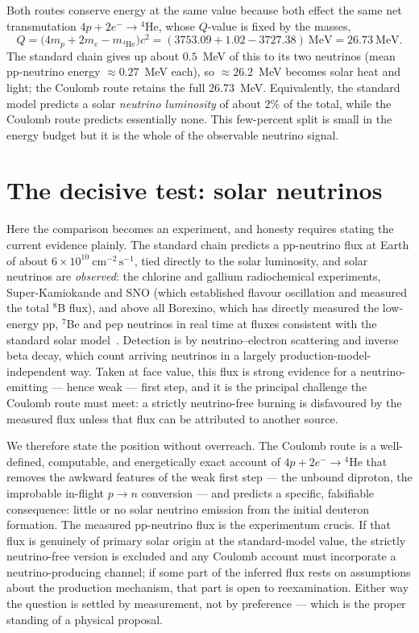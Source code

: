 \documentclass[11pt]{article}
\begin{document}
Both routes conserve energy at the same value because both effect the same net transmutation
$4p+2e^-\to{}^4\mathrm{He}$, whose $Q$-value is fixed by the masses,
\begin{equation}
Q = \big(4m_p + 2m_e - m_{^4\mathrm{He}}\big)c^2
  = (3753.09 + 1.02 - 3727.38)~\text{MeV} = 26.73~\text{MeV}.
\end{equation}
The standard chain gives up about $0.5$~MeV of this to its two neutrinos (mean pp-neutrino energy
$\approx 0.27$~MeV each), so $\approx 26.2$~MeV becomes solar heat and light; the Coulomb route retains
the full $26.73$~MeV. Equivalently, the standard model predicts a solar \emph{neutrino luminosity} of
about $2\%$ of the total, while the Coulomb route predicts essentially none. This few-percent split is
small in the energy budget but it is the whole of the observable neutrino signal.

\section{The decisive test: solar neutrinos}

Here the comparison becomes an experiment, and honesty requires stating the current evidence plainly.
The standard chain predicts a pp-neutrino flux at Earth of about
$6\times10^{10}~\mathrm{cm^{-2}\,s^{-1}}$, tied directly to the solar luminosity, and solar neutrinos
are \emph{observed}: the chlorine and gallium radiochemical experiments, Super-Kamiokande and SNO
(which established flavour oscillation and measured the total ${}^8$B flux), and above all Borexino,
which has directly measured the low-energy pp, ${}^7$Be and pep neutrinos in real time at fluxes
consistent with the standard solar model~\cite{Borexino,SNO,Adelberger}. Detection is by
neutrino--electron scattering and inverse beta decay, which count arriving neutrinos in a largely
production-model-independent way. Taken at face value, this flux is strong evidence for a
neutrino-emitting --- hence weak --- first step, and it is the principal challenge the Coulomb route
must meet: a strictly neutrino-free burning is disfavoured by the measured flux unless that flux can be
attributed to another source.

We therefore state the position without overreach. The Coulomb route is a well-defined, computable, and
energetically exact account of $4p+2e^-\to{}^4\mathrm{He}$ that removes the awkward features of the
weak first step --- the unbound diproton, the improbable in-flight $p\to n$ conversion --- and predicts
a specific, falsifiable consequence: little or no solar neutrino emission from the initial deuteron
formation. The measured pp-neutrino flux is the experimentum crucis. If that flux is genuinely of
primary solar origin at the standard-model value, the strictly neutrino-free version is excluded and
any Coulomb account must incorporate a neutrino-producing channel; if some part of the inferred flux
rests on assumptions about the production mechanism, that part is open to reexamination. Either way the
question is settled by measurement, not by preference --- which is the proper standing of a physical
proposal.
\end{document}
